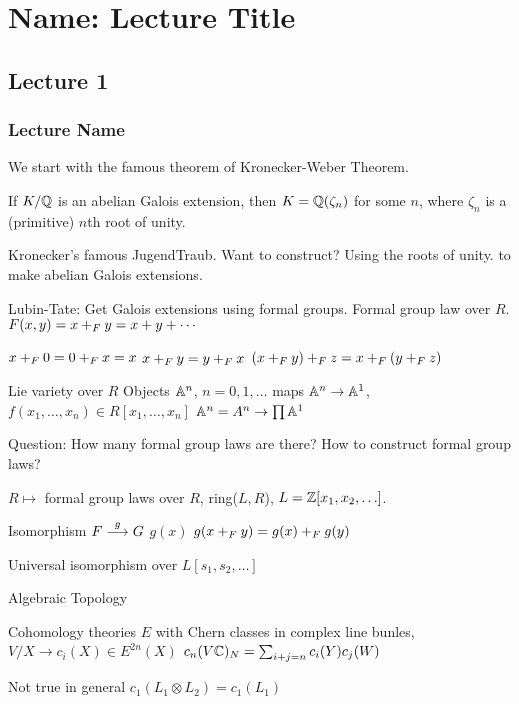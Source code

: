 \newpage
\section{Name: Lecture Title}
\subsection{Lecture 1}
\subsubsection{Lecture Name}

We start with the famous theorem of Kronecker-Weber Theorem.

\begin{thm}
If $K/\mathbb{Q}$ is an abelian Galois extension, then $K= \mathbb{Q}(\zeta_n)$ for some $n$, where $\zeta_n$ is a (primitive) $n$th root of unity. 
\end{thm}

Kronecker's famous JugendTraub. Want to construct? Using the roots of unity. to make abelian Galois extensions. 





Lubin-Tate: Get Galois extensions using formal groups. Formal group law over $R$. $F(x,y)= x+_F y= x + y + \cdots$

$x+_F 0 = 0+_F x= x$
$x+_F y= y +_F x$
$(x +_F y) +_F z = x +_F (y +_F z)$

Lie variety over $R$
Objects $\mathbb{A}^n$, $n= 0,1,\ldots$
maps $\mathbb{A}^n \to \mathbb{A}^1$, $f(x_1,\ldots,x_n) \in R[x_1,\ldots,x_n]$
$\mathbb{A}^n= A^n \to \prod \mathbb{A}^1$ 


Question: How many formal group laws are there? How to construct formal group laws?

\begin{thm}[Lazard]
$R \mapsto$ formal group laws over $R$, ring($L,R$), $L= \mathbb{Z}[x_1,x_2,\ldots]$.
\end{thm}

Isomorphism $F \stackrel{g}{\longrightarrow} G$
$g(x)$
$g(x +_F y)= g(x) +_F g(y)$

Universal isomorphism over $L[s_1,s_2,\ldots]$



Algebraic Topology

Cohomology theories $E$ with Chern classes in complex line bunles,
$V /X \to c_i(X) \in E^{2n}(X)$
$c_n(V\mathbb{C})_N= \sum_{i+j=n} c_i(Y) c_j(W)$

Not true in general $c_1(L_1 \otimes L_2)= c_1(L_1)$


